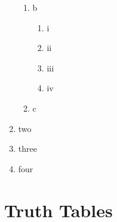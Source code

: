 \documentclass[11pt]{article}
\begin{document}
\begin{enumerate}
\begin{enumerate}
\item b
\begin{enumerate}
\item i
\item ii
\item iii
\item iv
\end{enumerate}

\item c
\end{enumerate}

\item two
\item three
\item four


\end{enumerate}

\section*{Truth Tables}
\end{document}
